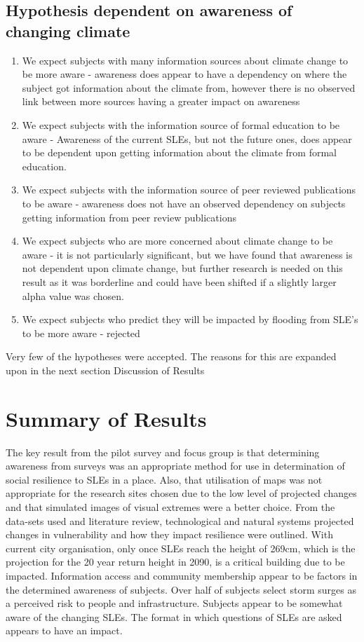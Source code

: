 \subsection{Hypothesis dependent on awareness of changing climate}
\begin{enumerate}
    \item We expect subjects with many information sources about climate change to be more aware - awareness does appear to have a dependency on where the subject got information about the climate from, however there is no observed link between more sources having a greater impact on awareness
    \item We expect subjects with the information source of formal education to be aware - Awareness of the current SLEs, but not the future ones, does appear to be dependent upon getting information about the climate from formal education. 
    \item We expect subjects with the information source of peer reviewed publications to be aware - awareness does not have an observed dependency on subjects getting information from peer review publications
    \item We expect subjects who are more concerned about climate change to be aware - it is not particularly significant, but we have found that awareness is not dependent upon climate change, but further research is needed on this result as it was borderline and could have been shifted if a slightly larger alpha value was chosen.
    \item We expect subjects who predict they will be impacted by flooding from SLE's to be more aware -  rejected
\end{enumerate}

Very few of the hypotheses were accepted. The reasons for this are expanded upon in the next section Discussion of Results

\section{Summary of Results}
The key result from the pilot survey and focus group is that determining awareness from surveys was an appropriate method for use in determination of social resilience to SLEs in a place. Also, that utilisation of maps was not appropriate for the research sites chosen due to the low level of projected changes and that simulated images of visual extremes were a better choice. From the data-sets used and literature review, technological and natural systems projected changes in vulnerability and how they impact resilience were outlined. With current city organisation, only once SLEs reach the height of 269cm, which is the projection for the 20 year return height in 2090, is a critical building due to be impacted. Information access and community membership appear to be factors in the determined awareness of subjects. Over half of subjects select storm surges as a perceived risk to people and infrastructure. Subjects appear to be somewhat aware of the changing SLEs. The format in which questions of SLEs are asked appears to have an impact. 

